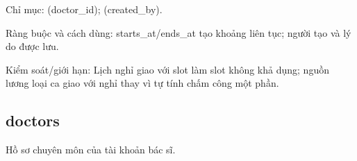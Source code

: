 Chỉ mục:\allowbreak{} (doctor\_\allowbreak{}id); (created\_\allowbreak{}by).\allowbreak{}

Ràng buộc và cách dùng:\allowbreak{} starts\_\allowbreak{}at/\allowbreak{}ends\_\allowbreak{}at tạo khoảng liên tục; người tạo và lý do được lưu.\allowbreak{}

Kiểm soát/\allowbreak{}giới hạn:\allowbreak{} Lịch nghỉ giao với slot làm slot không khả dụng; nguồn lương loại ca giao với nghỉ thay vì tự tính chấm công một phần.\allowbreak{}

\clearpage

\subsection{doctors}
Hồ sơ chuyên môn của tài khoản bác sĩ.\allowbreak{}


